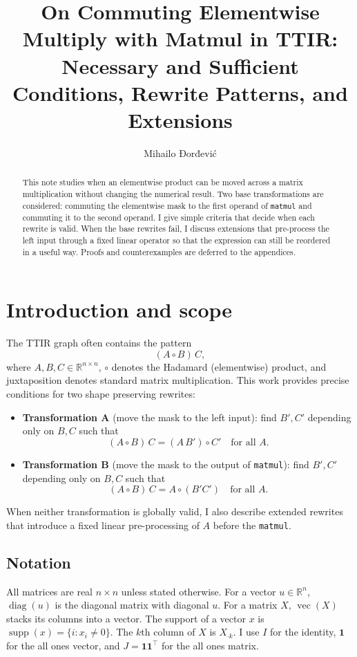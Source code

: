 \documentclass[11pt,a4paper]{article}
\title{\vspace{-6mm}\Large On Commuting Elementwise Multiply with Matmul in TTIR:\\
Necessary and Sufficient Conditions, Rewrite Patterns, and Extensions}
\author{\foreignlanguage{serbian}{Mihailo Đorđević}}
\date{}
\theoremstyle{definition}
\newcommand{\R}{\mathbb{R}}
\newcommand{\Had}{\circ}
\newcommand{\diag}{\operatorname{diag}}
\newcommand{\vecop}{\operatorname{vec}}
\newcommand{\supp}{\operatorname{supp}}
\begin{document}
\maketitle
\vspace{-6mm}

\begin{abstract}
This note studies when an elementwise product can be moved across a matrix multiplication without changing the numerical result. Two base transformations are considered: commuting the elementwise mask to the first operand of \texttt{matmul} and commuting it to the second operand. I give simple criteria that decide when each rewrite is valid. When the base rewrites fail, I discuss extensions that pre-process the left input through a fixed linear operator so that the expression can still be reordered in a useful way. Proofs and counterexamples are deferred to the appendices.
\end{abstract}

\tableofcontents
\clearpage

\section{Introduction and scope}
\label{sec:intro}
The TTIR graph often contains the pattern
\[
(A \Had B) \, C,
\]
where $A,B,C \in \R^{n\times n}$, $\Had$ denotes the Hadamard (elementwise) product, and juxtaposition denotes standard matrix multiplication. This work provides precise conditions for two shape preserving rewrites:
\begin{itemize}
  \item \textbf{Transformation A} (move the mask to the left input): find $B',C'$ depending only on $B,C$ such that
  \[
    (A \Had B) \, C = (A\,B') \Had C' \quad \text{for all } A.
  \]
  \item \textbf{Transformation B} (move the mask to the output of \texttt{matmul}): find $B',C'$ depending only on $B,C$ such that
  \[
    (A \Had B) \, C = A \Had (B' C') \quad \text{for all } A.
  \]
\end{itemize}
When neither transformation is globally valid, I also describe extended rewrites that introduce a fixed linear pre-processing of $A$ before the \texttt{matmul}.

\subsection{Notation}
All matrices are real $n\times n$ unless stated otherwise. For a vector $u\in\R^n$, $\diag(u)$ is the diagonal matrix with diagonal $u$. For a matrix $X$, $\vecop(X)$ stacks its columns into a vector. The support of a vector $x$ is $\supp(x)=\{i: x_i\ne 0\}$. The $k$th column of $X$ is $X_{\cdot k}$. I use $I$ for the identity, $\bm{1}$ for the all ones vector, and $J=\bm{1}\bm{1}^\top$ for the all ones matrix.
\end{document}
